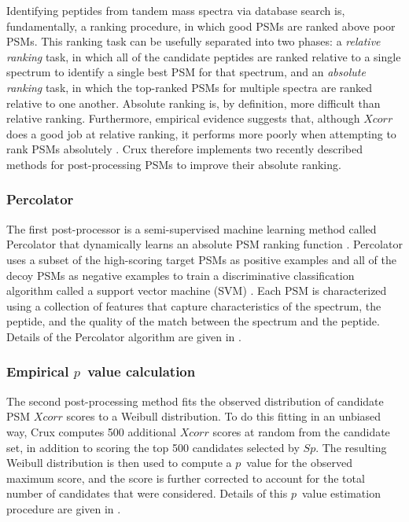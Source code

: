 \documentclass[12pt]{article}
\begin{document}
Identifying peptides from tandem mass spectra via database search is,
fundamentally, a ranking procedure, in which good PSMs are ranked
above poor PSMs.  This ranking task can be usefully separated into two
phases: a {\em relative ranking} task, in which all of the candidate
peptides are ranked relative to a single spectrum to identify a single
best PSM for that spectrum, and an {\em absolute ranking} task, in
which the top-ranked PSMs for multiple spectra are ranked relative to
one another.  Absolute ranking is, by definition, more difficult than
relative ranking.  Furthermore, empirical evidence suggests that,
although $Xcorr$ does a good job at relative ranking, it performs more
poorly when attempting to rank PSMs absolutely \cite{keller:empirical,
anderson:new}. Crux therefore implements two recently described
methods for post-processing PSMs to improve their absolute ranking.

\subsubsection{Percolator}
\label{section:percolator}

The first post-processor is a semi-supervised machine learning method
called Percolator that dynamically learns an absolute PSM ranking
function \cite{kall:semi-supervised}.  Percolator uses a subset of the
high-scoring target PSMs as positive examples and all of the decoy
PSMs as negative examples to train a discriminative classification
algorithm called a support vector machine (SVM) \cite{boser:training,
noble:what}.  Each PSM is characterized using a collection of features
that capture characteristics of the spectrum, the peptide, and the
quality of the match between the spectrum and the peptide.  Details of
the Percolator algorithm are given in \cite{kall:semi-supervised}.

\subsubsection{Empirical $p$~value calculation}

The second post-processing method fits the observed distribution of
candidate PSM $Xcorr$ scores to a Weibull distribution.  To do this
fitting in an unbiased way, Crux computes 500 additional $Xcorr$ scores
at random from the candidate set, in addition to scoring the top 500
candidates selected by $Sp$.  The resulting Weibull distribution is
then used to compute a $p$~value for the observed maximum score, and
the score is further corrected to account for the total number of
candidates that were considered.  Details of this $p$~value estimation
procedure are given in \cite{klammer:not}.
\end{document}
